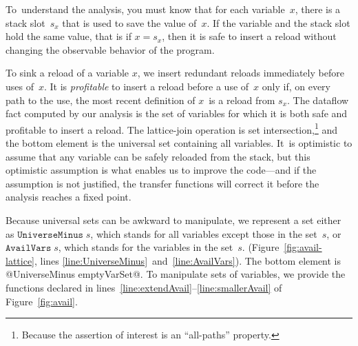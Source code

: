 \documentclass[blockstyle,preprint,natbib,nocopyrightspace]{sigplanconf}
\newcommand\linepairref[2]{lines \ref{line:#1}~and~\ref{line:#2}}
\newcommand\linerangeref[2]{\mbox{lines~\ref{line:#1}--\ref{line:#2}}}
\newcommand\slotof[1]{\ensuremath{s_{#1}}}
\newcommand\figref[1]{Figure~\ref{fig:#1}}
\begin{document}
%
%



To~understand the analysis, you must know that for each variable~$x$,
there is a stack slot~\slotof x that is used to save the value of~$x$.
%
If the variable and the stack slot hold the same value,
that is if $x = \slotof x$,
then it is safe to insert a reload without changing the observable
behavior of the program.

To sink a reload of a variable $x$, we insert redundant reloads immediately
before uses of~$x$.
It is \emph{profitable} to insert a reload before a use of~$x$ only if, 
on every path to the use, the most recent definition of $x$~is a reload from
$\slotof x$.
The dataflow fact computed by our analysis is the set of variables for
which it is both 
safe and profitable to insert a reload.
The lattice-join operation is set intersection,\footnote
{Because the assertion of interest is an ``all-paths'' property.}
and the bottom element
is the universal set containing all variables.
It~is optimistic to assume that any variable can be safely reloaded from the stack,
but this optimistic assumption is what enables us to improve the
code---and if the assumption is not justified, the transfer functions
will correct it before
the analysis reaches a fixed point.

\ifpagetuning\enlargethispage{\baselineskip}\fi

Because universal sets can be awkward to manipulate, we represent a
set either as
$\mathtt{UniverseMinus}\;s$, which stands for all variables except
those in the set~$s$,
or $\mathtt{AvailVars}\;s$, which stands for the variables in the set~$s$.
(\figref{avail-lattice}, \linepairref{UniverseMinus}{AvailVars}).
%
%
The bottom element is @UniverseMinus emptyVarSet@.
To manipulate sets of variables, we provide the functions declared in
\linerangeref{extendAvail}{smallerAvail} of \figref{avail}.



\end{document}
